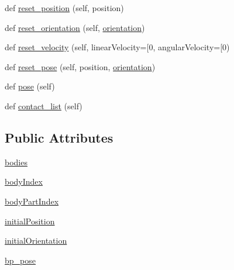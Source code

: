 \begin{DoxyCompactItemize}
def \hyperlink{classpybullet-gym_1_1pybulletgym_1_1envs_1_1roboschool_1_1robots_1_1robot__bases_1_1_body_part_a98d4f1f86c51f0e6b49484ec2f553d5d}{reset\+\_\+position} (self, position)
\item 
def \hyperlink{classpybullet-gym_1_1pybulletgym_1_1envs_1_1roboschool_1_1robots_1_1robot__bases_1_1_body_part_a4144e6cf3d0a4406d97b0779ca5d94f0}{reset\+\_\+orientation} (self, \hyperlink{namespacepybullet-gym_1_1pybulletgym_1_1envs_1_1roboschool_1_1robots_1_1robot__bases_abd4cbcc66314feda5543ea5221592127}{orientation})
\item 
def \hyperlink{classpybullet-gym_1_1pybulletgym_1_1envs_1_1roboschool_1_1robots_1_1robot__bases_1_1_body_part_a230636b4d7230b55cc0d5be9f53b533a}{reset\+\_\+velocity} (self, linear\+Velocity=\mbox{[}0, angular\+Velocity=\mbox{[}0)
\item 
def \hyperlink{classpybullet-gym_1_1pybulletgym_1_1envs_1_1roboschool_1_1robots_1_1robot__bases_1_1_body_part_a5c2c9db84d629aed4f495546d3b62a51}{reset\+\_\+pose} (self, position, \hyperlink{namespacepybullet-gym_1_1pybulletgym_1_1envs_1_1roboschool_1_1robots_1_1robot__bases_abd4cbcc66314feda5543ea5221592127}{orientation})
\item 
def \hyperlink{classpybullet-gym_1_1pybulletgym_1_1envs_1_1roboschool_1_1robots_1_1robot__bases_1_1_body_part_af3f845550d5f00bee268e96ddda85ec7}{pose} (self)
\item 
def \hyperlink{classpybullet-gym_1_1pybulletgym_1_1envs_1_1roboschool_1_1robots_1_1robot__bases_1_1_body_part_a122b953f7ab9e90058a573ff7c5d6472}{contact\+\_\+list} (self)
\end{DoxyCompactItemize}
\subsection*{Public Attributes}
\begin{DoxyCompactItemize}
\item 
\hyperlink{classpybullet-gym_1_1pybulletgym_1_1envs_1_1roboschool_1_1robots_1_1robot__bases_1_1_body_part_a8b2d0098231e0f9ba7e1b1cf0411d54a}{bodies}
\item 
\hyperlink{classpybullet-gym_1_1pybulletgym_1_1envs_1_1roboschool_1_1robots_1_1robot__bases_1_1_body_part_a13d175a07a026c5a44c3a2536b028b2b}{body\+Index}
\item 
\hyperlink{classpybullet-gym_1_1pybulletgym_1_1envs_1_1roboschool_1_1robots_1_1robot__bases_1_1_body_part_ae54b20b5f49cb548ead79fda5dde8c4f}{body\+Part\+Index}
\item 
\hyperlink{classpybullet-gym_1_1pybulletgym_1_1envs_1_1roboschool_1_1robots_1_1robot__bases_1_1_body_part_ac09fc874b2389c464cacd101582dac31}{initial\+Position}
\item 
\hyperlink{classpybullet-gym_1_1pybulletgym_1_1envs_1_1roboschool_1_1robots_1_1robot__bases_1_1_body_part_a9857ec9c9817ef5598fcb22a070ebaf4}{initial\+Orientation}
\item 
\hyperlink{classpybullet-gym_1_1pybulletgym_1_1envs_1_1roboschool_1_1robots_1_1robot__bases_1_1_body_part_a652bdd3e01626fed019d813cb87ec664}{bp\+\_\+pose}
\end{DoxyCompactItemize}


